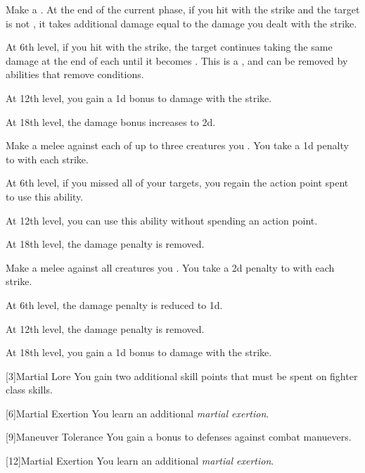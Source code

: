 {             Make a .
            At the end of the current phase, if you hit with the strike and the target is not , it takes additional damage equal to the damage you dealt with the strike.
            \par At 6th level, if you hit with the strike, the target continues taking the same damage at the end of each  until it becomes .
            This is a , and can be removed by abilities that remove conditions.
            \par At 12th level, you gain a \plus1d bonus to damage with the strike.
            \par At 18th level, the damage bonus increases to \plus2d.

             Make a melee  against each of up to three creatures you .
            You take a \minus1d penalty to  with each strike.
            \par At 6th level, if you missed all of your targets, you regain the action point spent to use this ability.
            \par At 12th level, you can use this ability without spending an action point.
            \par At 18th level, the damage penalty is removed.

             Make a melee  against all creatures you .
            You take a \minus2d penalty to  with each strike.
            \par At 6th level, the damage penalty is reduced to \minus1d.
            \par At 12th level, the damage penalty is removed.
            \par At 18th level, you gain a \plus1d bonus to damage with the strike.
        }

        [3]{Martial Lore} You gain two additional skill points that must be spent on fighter class skills.

        [6]{Martial Exertion}
        You learn an additional \textit{martial exertion}.

        [9]{Maneuver Tolerance} You gain a  bonus to defenses against combat manuevers.

        [12]{Martial Exertion} 
        You learn an additional \textit{martial exertion}.

